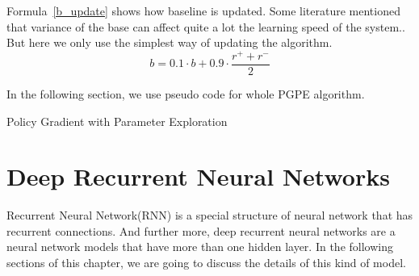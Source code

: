 \documentclass[officiallayout]{tktla}
\begin{document}
Formula~\ref{b_update} shows how baseline is updated. Some literature mentioned that variance of the base can affect quite a lot the learning speed of the system.\cite{zhao2011analysis}. But here we only use the simplest way of updating the algorithm.
\begin{equation}
b = 0.1 \cdot b + 0.9 \cdot \frac{r^+ + r^-}{2}
\label{b_update}
\end{equation}


In the following section, we use pseudo code for whole PGPE algorithm.
\newline
\newline
\begin{algorithm}[H]
\caption{Policy Gradient with Parameter Exploration}
 
\label{alg:pepg}
\end{algorithm}
 


\chapter{Deep Recurrent Neural Networks}
Recurrent Neural Network(RNN) is a special structure of neural network that has recurrent connections. And further more, deep recurrent neural networks are a neural network models that have more than one hidden layer.  In the following sections of this chapter, we are going to discuss the details of this kind of model. 
\end{document}
